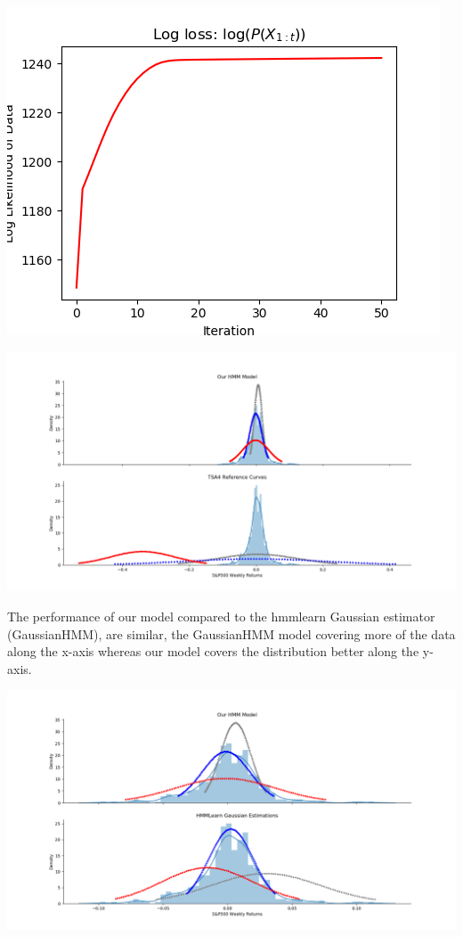 \documentclass[12pt]{article}
\begin{document}
\begin{center}
	\includegraphics[width=1\linewidth]{figures/problem-3-2.png} 
\end{center}

\begin{center}
	\includegraphics[width=1\linewidth]{figures/problem-3-3.png} 
\end{center}

The performance of our model compared to the hmmlearn Gaussian estimator (GaussianHMM),  are similar, the GaussianHMM model covering more of the data along the x-axis whereas our model covers the
distribution better along the y-axis.
\begin{center}
	\includegraphics[width=1\linewidth]{figures/problem-3-4.png} 
\end{center}
\end{document}
